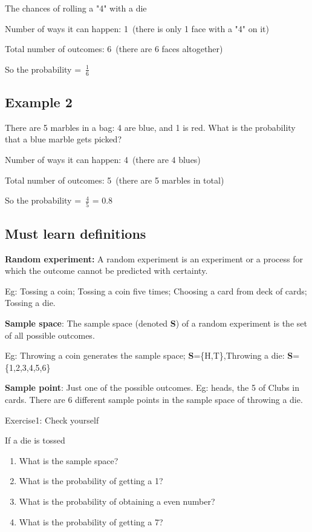 \documentclass[
]{book}
\providecommand{\tightlist}{%
  \setlength{\itemsep}{0pt}\setlength{\parskip}{0pt}}
\begin{document}
The chances of rolling a "4" with a die

Number of ways it can happen: 1~(there is only 1 face with a "4" on it)

Total number of outcomes: 6~(there are 6 faces altogether)

So the probability =~\(\frac{1}{6}\)

\hypertarget{example-2}{%
\subsection*{Example 2}\label{example-2}}

There are 5 marbles in a bag: 4 are blue, and 1 is red. What is the probability that a blue marble gets picked?

Number of ways it can happen: 4~(there are 4 blues)

Total number of outcomes: 5~(there are 5 marbles in total)

So the probability =~\(\frac{4}{5}\) = 0.8

\hypertarget{must-learn-definitions}{%
\subsection*{Must learn definitions}\label{must-learn-definitions}}

\textbf{Random experiment:} A random experiment is an experiment or a process for which the outcome cannot be predicted with certainty.

Eg: Tossing a coin; Tossing a coin five times; Choosing a card from deck
of cards; Tossing a die.

\textbf{Sample space}: The sample space (denoted \textbf{S}) of a random experiment is the set of all possible outcomes.

Eg: Throwing a coin generates the sample space; \textbf{S}=\{H,T\},Throwing a die: \textbf{S}= \{1,2,3,4,5,6\}

\textbf{Sample point}: Just one of the possible outcomes. Eg: heads, the 5 of Clubs in cards. There are 6 different sample points in the sample space of throwing a
die.

\begin{rmdnote}
Exercise1: Check yourself

If a die is tossed

\begin{enumerate}
\def\labelenumi{\arabic{enumi}.}
\tightlist
\item
  What is the sample space?\\
\item
  What is the probability of getting a 1?\\
\item
  What is the probability of obtaining a even number?
\item
  What is the probability of getting a 7?
\end{enumerate}
\end{rmdnote}
\end{document}
